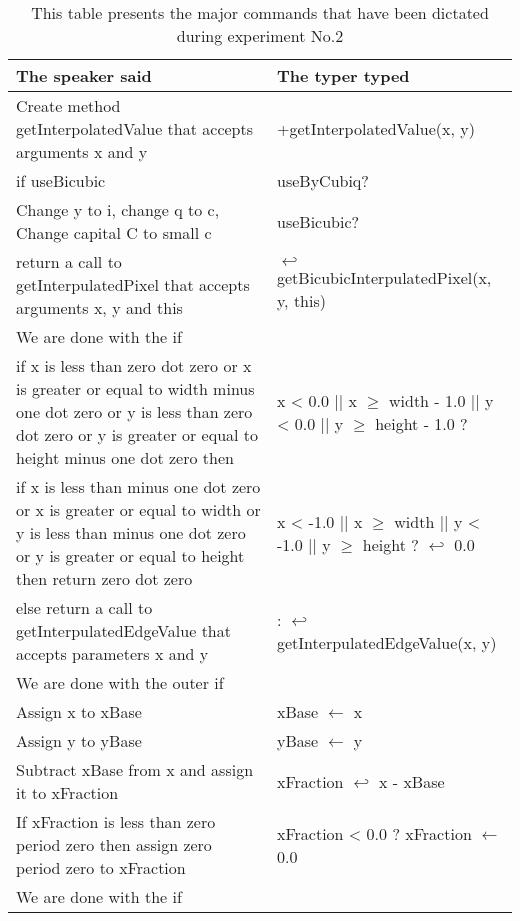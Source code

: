 \begin{table}[H]
	\begin{tabular}{|p{10cm}|p{6cm}|}
		\hline
		\rowcolor[HTML]{9B9B9B} 
		{\color[HTML]{000000} The speaker said} & {\color[HTML]{000000} The typer typed} \\ \hline
		Create method getInterpolatedValue that accepts arguments x and y & +getInterpolatedValue(x, y) \\ \hline
		if useBicubic & useByCubiq? \\ \hline
		Change y to i, change q to c, Change capital C to small c & useBicubic? \\ \hline
		return a call to getInterpulatedPixel that accepts arguments x, y and this & $\hookleftarrow$ getBicubicInterpulatedPixel(x, y, this) \\ \hline
		We are done with the if & \\ \hline
		if x is less than zero dot zero or x is greater or equal to width minus one dot zero or y is less than zero dot zero or y is greater or equal to height minus one dot zero then & x < 0.0 || x $\geq$ width - 1.0 || y < 0.0 || y $\geq$ height - 1.0 ? \\ \hline
		if x is less than minus one dot zero or x is greater or equal to width or y is less than minus one dot zero or y is greater or equal to height then return zero dot zero & x < -1.0 || x $\geq$ width || y < -1.0 || y $\geq$ height ?  $\hookleftarrow$ 0.0 \\ \hline
		else return a call to getInterpulatedEdgeValue that accepts parameters x and y & : $\hookleftarrow$ getInterpulatedEdgeValue(x, y) \\ \hline
		We are done with the outer if &  \\ \hline
		Assign x to xBase & xBase $\leftarrow$ x \\ \hline
		Assign y to yBase & yBase $\leftarrow$ y \\ \hline 
		Subtract xBase from x and assign it to xFraction & xFraction $\hookleftarrow$ x - xBase \\ \hline
		If xFraction is less than zero period zero then assign zero period zero to xFraction & xFraction < 0.0 ? xFraction $\leftarrow$ 0.0\\ \hline
		We are done with the if  &  \\ \hline 
	\end{tabular}
	\caption{This table presents the major commands that have been dictated during experiment No.2}
	\label{tab2}
\end{table}
